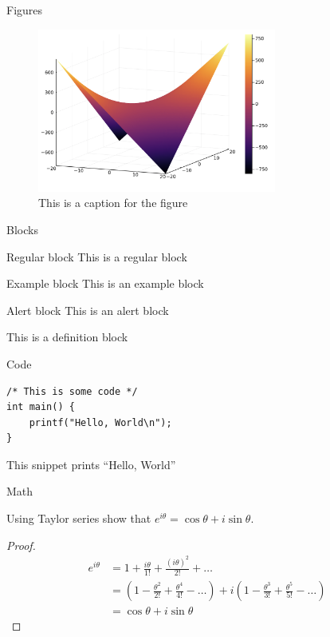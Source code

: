 \documentclass[10pt]{beamer}
\begin{document}
\begin{frame}{Figures}
    \begin{figure}
        \centering
        \includegraphics[width=0.7\textwidth]{
            assets/slides/image-2.png
        }
        \caption{This is a caption for the figure}
        \label{fig:figure-b}
    \end{figure}
\end{frame}

\begin{frame}{Blocks}
  \begin{block}{Regular block}
    This is a regular block
  \end{block}
  
  \begin{exampleblock}{Example block}
    This is an example block
  \end{exampleblock}

  \begin{alertblock}{Alert block}
    This is an alert block
  \end{alertblock}

  \begin{definition}
    This is a definition block
  \end{definition}
\end{frame}

\begin{frame}[fragile]{Code}
\begin{lstlisting}
/* This is some code */
int main() {
    printf("Hello, World\n");
}
\end{lstlisting}

This snippet prints ``Hello, World''
\end{frame}

\begin{frame}{Math}
    \begin{theorem}
        Using Taylor series show that $e^{i\theta} = \cos\theta + i \sin\theta$.
    \end{theorem}
    \begin{proof}
        \begin{align*}
            e^{i\theta} &= 1 + \frac{i\theta}{1!} + \frac{(i\theta)^2}{2!} + \ldots \\
            &= (1 - \frac{\theta^2}{2!} + \frac{\theta^4}{4!} - \ldots) + i (1 - \frac{\theta^3}{3!} + \frac{\theta^5}{5!} - \ldots) \\
            &= \cos\theta + i \sin\theta
        \end{align*}
    \end{proof}
\end{frame}
\end{document}
